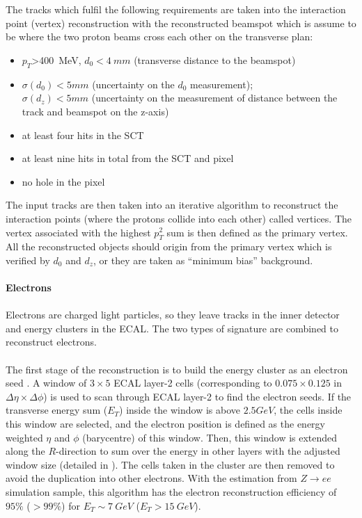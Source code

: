 \\
\\The tracks which fulfil the following requirements are taken into the interaction point (vertex) reconstruction with the reconstructed beamspot which is assume to be where the two proton beams cross each other on the transverse plan\cite{Aaboud:2016rmg}:
\begin{itemize}
	\item $p_{T}$>400~MeV, $d_{0}<4~mm$ (transverse distance to the beamspot)
	\item $\sigma(d_0)<5mm$ (uncertainty on the $d_0$ measurement);\\ $\sigma(d_z)<5mm$ (uncertainty on the measurement of distance between the track and beamspot on the z-axis)
	\item at least four hits in the SCT
	\item at least nine hits in total from the SCT and pixel
	\item no hole in the pixel 
\end{itemize}
\noindent
The input tracks are then taken into an iterative algorithm\cite{Aaboud:2016rmg} to reconstruct the interaction points (where the protons collide into each other) called vertices. The vertex associated with the highest $p_{T}^2$ sum is then defined as the primary vertex. All the reconstructed objects should origin from the primary vertex which is verified by $d_{0}$ and $d_z$, or they are taken as ``minimum bias'' background.  
\\
\\{\bf Electrons}
\\
\\Electrons are charged light particles, so they leave tracks in the inner detector and energy clusters in the ECAL. The two types of signature are combined to reconstruct electrons.
\\
\\The first stage of the reconstruction is to build the energy cluster as an electron seed \cite{ATLAS-CONF-2016-024,ATL-LARG-PUB-2008-002}. A window of $3 \times 5$ ECAL layer-2 cells (corresponding to $0.075 \times 0.125$ in $\Delta \eta \times \Delta \phi$) is used to scan through ECAL layer-2 to find the electron seeds. If the transverse energy sum ($E_{T}$) inside the window is above $2.5GeV$, the cells inside this window are selected, and the electron position is defined as the energy weighted $\eta$ and $\phi$ (barycentre) of this window. Then, this window is extended along the $R$-direction to sum over the energy in other layers with the adjusted window size (detailed in \cite{ATL-LARG-PUB-2008-002}). The cells taken in the cluster are then removed to avoid the duplication into other electrons. With the estimation from $Z\to ee$ simulation sample, this algorithm has the electron reconstruction efficiency of $95\%$ ($>99\%$) for $E_{T}\sim7~GeV$ ($E_{T}>15~GeV$).
